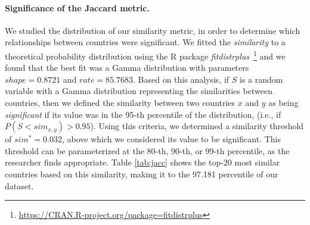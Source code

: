\paragraph{Significance of the Jaccard metric.}
%
We studied the distribution of our similarity metric, in order to determine
which relationships between countries were significant. 
%
We fitted the \emph{similarity} to a theoretical probability distribution using
the R package {\em
fitdistrplus}~\footnote{\url{https://CRAN.R-project.org/package=fitdistrplus}}
and we found that the best fit was a Gamma distribution with parameters
$shape=0.8721$ and $rate=85.7683$.
%
Based on this analysis, if $S$ is a random variable with a Gamma distribution
representing the similarities between countries, then we defined the similarity
between two countries $x$ and $y$ as being {\em significant} if its value was in
the 95-th percentile of the distribution, (i.e., if $P( S < sim_{x,y} ) >
0.95$).
%
Using this criteria, we determined a similarity threshold of $sim^*=0.032$,
above which we considered its value to be significant. 
%
This threshold can be parameterized at the 80-th, 90-th, or 99-th percentile, as
the researcher finds appropriate.  
%
Table \ref{tab:jacc} shows the top-20 most similar countries based on this
similarity, making it to the 97.181 percentile of our dataset. \\

